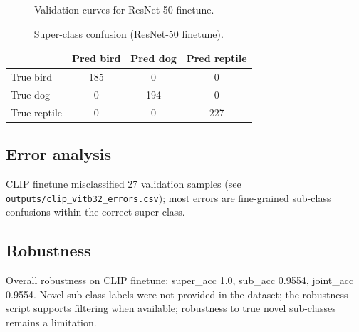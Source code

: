\documentclass{article}
\begin{document}
\begin{figure}[h]
\centering
{}
\hfill
{}
\caption{Validation curves for ResNet-50 finetune.}
\label{fig:curves}
\end{figure}

\begin{table}[h]
\centering
\begin{tabular}{lccc}
\toprule
 & Pred bird & Pred dog & Pred reptile \\
\midrule
True bird & 185 & 0 & 0 \\
True dog & 0 & 194 & 0 \\
True reptile & 0 & 0 & 227 \\
\bottomrule
\end{tabular}
\caption{Super-class confusion (ResNet-50 finetune).}
\label{tab:confusion}
\end{table}

\subsection{Error analysis}
CLIP finetune misclassified 27 validation samples (see \texttt{outputs/clip\_vitb32\_errors.csv}); most errors are fine-grained sub-class confusions within the correct super-class.

\subsection{Robustness}
Overall robustness on CLIP finetune: super\_acc 1.0, sub\_acc 0.9554, joint\_acc 0.9554. Novel sub-class labels were not provided in the dataset; the robustness script supports filtering when available; robustness to true novel sub-classes remains a limitation.
\end{document}
